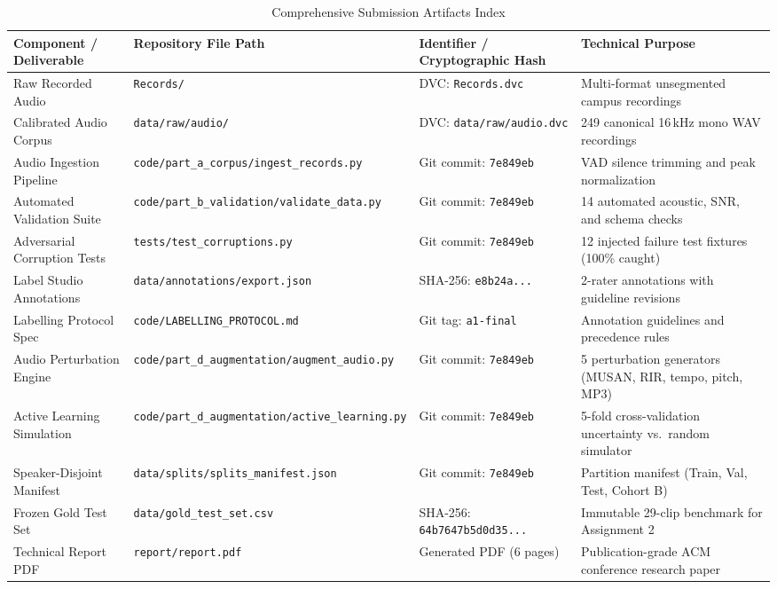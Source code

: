 \documentclass[sigconf,authordraft]{acmart}
\begin{document}
\begin{table}[t]
  \caption{Comprehensive Submission Artifacts Index}
  \label{tab:artifacts_index}
  \centering
  \small
  \begin{tabular}{llll}
    \toprule
    \textbf{Component / Deliverable} & \textbf{Repository File Path} & \textbf{Identifier / Cryptographic Hash} & \textbf{Technical Purpose} \\
    \midrule
    Raw Recorded Audio & \texttt{Records/} & DVC: \texttt{Records.dvc} & Multi-format unsegmented campus recordings \\
    Calibrated Audio Corpus & \texttt{data/raw/audio/} & DVC: \texttt{data/raw/audio.dvc} & 249 canonical 16\,kHz mono WAV recordings \\
    Audio Ingestion Pipeline & \texttt{code/part\_a\_corpus/ingest\_records.py} & Git commit: \texttt{7e849eb} & VAD silence trimming and peak normalization \\
    Automated Validation Suite & \texttt{code/part\_b\_validation/validate\_data.py} & Git commit: \texttt{7e849eb} & 14 automated acoustic, SNR, and schema checks \\
    Adversarial Corruption Tests & \texttt{tests/test\_corruptions.py} & Git commit: \texttt{7e849eb} & 12 injected failure test fixtures (100\% caught) \\
    Label Studio Annotations & \texttt{data/annotations/export.json} & SHA-256: \texttt{e8b24a...} & 2-rater annotations with guideline revisions \\
    Labelling Protocol Spec & \texttt{code/LABELLING\_PROTOCOL.md} & Git tag: \texttt{a1-final} & Annotation guidelines and precedence rules \\
    Audio Perturbation Engine & \texttt{code/part\_d\_augmentation/augment\_audio.py} & Git commit: \texttt{7e849eb} & 5 perturbation generators (MUSAN, RIR, tempo, pitch, MP3) \\
    Active Learning Simulation & \texttt{code/part\_d\_augmentation/active\_learning.py} & Git commit: \texttt{7e849eb} & 5-fold cross-validation uncertainty vs.\ random simulator \\
    Speaker-Disjoint Manifest & \texttt{data/splits/splits\_manifest.json} & Git commit: \texttt{7e849eb} & Partition manifest (Train, Val, Test, Cohort B) \\
    Frozen Gold Test Set & \texttt{data/gold\_test_set.csv} & SHA-256: \texttt{64b7647b5d0d35...} & Immutable 29-clip benchmark for Assignment 2 \\
    Technical Report PDF & \texttt{report/report.pdf} & Generated PDF (6 pages) & Publication-grade ACM conference research paper \\
    \bottomrule
  \end{tabular}
\end{table}
\end{document}

